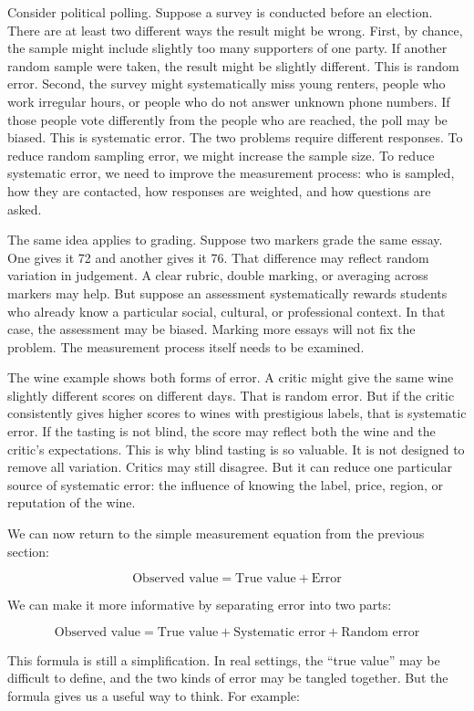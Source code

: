 \documentclass[
  letterpaper,
  DIV=11,
  numbers=noendperiod]{scrreprt}
\begin{document}
Consider political polling. Suppose a survey is conducted before an
election. There are at least two different ways the result might be
wrong. First, by chance, the sample might include slightly too many
supporters of one party. If another random sample were taken, the result
might be slightly different. This is random error. Second, the survey
might systematically miss young renters, people who work irregular
hours, or people who do not answer unknown phone numbers. If those
people vote differently from the people who are reached, the poll may be
biased. This is systematic error. The two problems require different
responses. To reduce random sampling error, we might increase the sample
size. To reduce systematic error, we need to improve the measurement
process: who is sampled, how they are contacted, how responses are
weighted, and how questions are asked.

The same idea applies to grading. Suppose two markers grade the same
essay. One gives it 72 and another gives it 76. That difference may
reflect random variation in judgement. A clear rubric, double marking,
or averaging across markers may help. But suppose an assessment
systematically rewards students who already know a particular social,
cultural, or professional context. In that case, the assessment may be
biased. Marking more essays will not fix the problem. The measurement
process itself needs to be examined.

The wine example shows both forms of error. A critic might give the same
wine slightly different scores on different days. That is random error.
But if the critic consistently gives higher scores to wines with
prestigious labels, that is systematic error. If the tasting is not
blind, the score may reflect both the wine and the critic's
expectations. This is why blind tasting is so valuable. It is not
designed to remove all variation. Critics may still disagree. But it can
reduce one particular source of systematic error: the influence of
knowing the label, price, region, or reputation of the wine.

We can now return to the simple measurement equation from the previous
section:

\[
\text{Observed value} = \text{True value} + \text{Error}
\]

We can make it more informative by separating error into two parts:

\[
\text{Observed value} = \text{True value} + \text{Systematic error} + \text{Random error}
\]

This formula is still a simplification. In real settings, the ``true
value'' may be difficult to define, and the two kinds of error may be
tangled together. But the formula gives us a useful way to think. For
example:
\end{document}
